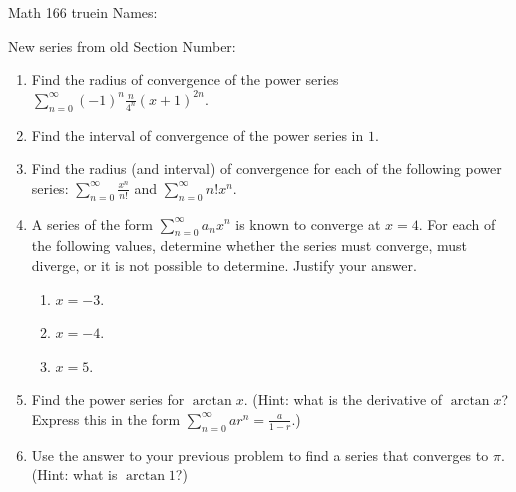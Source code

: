 \documentclass[12pt]{article}
\begin{document}
\pagestyle{empty} %

\noindent
{Math 166  truein  Names:\ \hrulefill}

\noindent
{New series from old}
\noindent \hspace{2.5in} Section Number: \hrulefill
\bigskip


\begin{enumerate}
\item Find the {radius of convergence} of the power series  $\displaystyle\sum_{n=0}^{\infty} (-1)^n \displaystyle\frac{n}{4^n}(x+1)^{2n}$.


\vfill

\item Find the {interval of convergence} of the power series in $1$.

\vfill










\newpage
\item Find the {radius (and interval) of convergence} for each of the following power series:  $\displaystyle\sum_{n=0}^{\infty} \displaystyle\frac{x^{n}}{n!}$ and  $\displaystyle\sum_{n=0}^{\infty} n!x^{n}$.

\vfill
\vfill
\vfill
\pagebreak
\item A series of the form $\sum_{n = 0}^\infty a_n x^n$ is known to converge at $x = 4$.  For each of the following values, determine whether the series must converge, must diverge, or it is not possible to determine.  Justify your answer.
\begin{enumerate}
\item $x = -3$.
\vspace{1 in}
\item $x = -4$.
\vspace{1 in}
\item $x = 5$.
\vspace{1 in}
\end{enumerate}



\item Find the power series for $\arctan x$.  (Hint: what is the derivative of $\arctan x$?  Express this in the form $\displaystyle \sum_{n = 0}^\infty ar^n = \frac{a}{1 - r}$.)
\vfill
\vfill
\vfill


\item Use the answer to your previous problem to find a series that converges to $\pi$.  (Hint: what is $\arctan 1$?)
\vfill


\end{enumerate}
\end{document}
